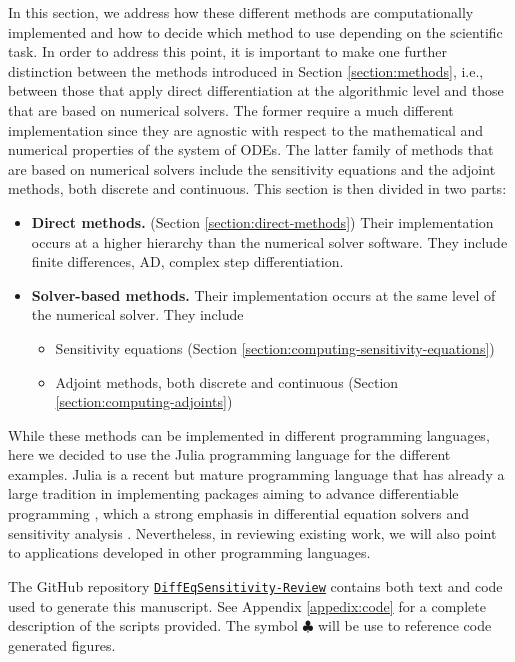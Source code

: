 
In this section, we address how these different methods are computationally implemented and how to decide which method to use depending on the scientific task.
In order to address this point, it is important to make one further distinction between the methods introduced in Section \ref{section:methods}, i.e., between those that apply direct differentiation at the algorithmic level and those that are based on numerical solvers.  
The former require a much different implementation since they are agnostic with respect to the mathematical and numerical properties of the system of ODEs.
The latter family of methods that are based on numerical solvers include the sensitivity equations and the adjoint methods, both discrete and continuous.
This section is then divided in two parts:
\begin{itemize}
    \item \textbf{Direct methods.} (Section \ref{section:direct-methods}) Their implementation occurs at a higher hierarchy than the numerical solver software. They include finite differences, AD, complex step differentiation.
    \item \textbf{Solver-based methods.} Their implementation occurs at the same level of the numerical solver. They include 
    \begin{itemize}
        \item Sensitivity equations (Section \ref{section:computing-sensitivity-equations})
        \item Adjoint methods, both discrete and continuous (Section \ref{section:computing-adjoints})
    \end{itemize}
\end{itemize}
While these methods can be implemented in different programming languages, here we decided to use the Julia programming language for the different examples. 
Julia is a recent but mature programming language that has already a large tradition in implementing packages aiming to advance differentiable programming \cite{Bezanson_Karpinski_Shah_Edelman_2012, Julialang_2017}, which a strong emphasis in differential equation solvers \cite{Rackauckas_Nie_2016} and sensitivity analysis \cite{rackauckas2020universal}.
Nevertheless, in reviewing existing work, we will also point to applications developed in other programming languages.

The GitHub repository \href{https://github.com/ODINN-SciML/DiffEqSensitivity-Review}{\texttt{DiffEqSensitivity-Review}} contains both text and code used to generate this manuscript. 
See Appendix \ref{appedix:code} for a complete description of the scripts provided. 
The symbol $\clubsuit$ will be use to reference code generated figures. 